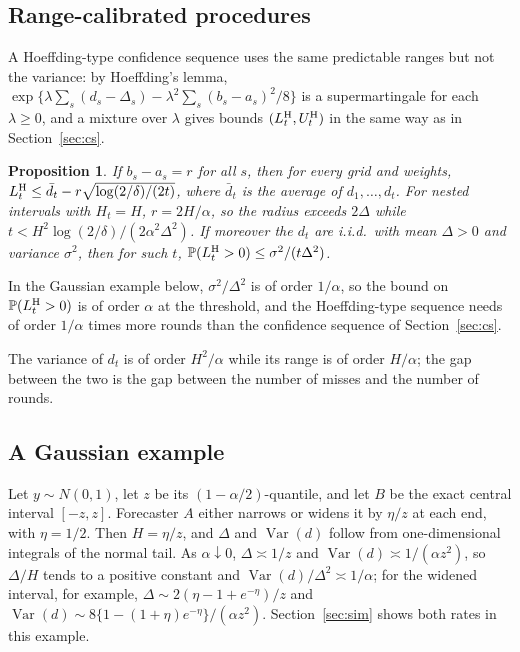 \documentclass[11pt]{article}
\newtheorem{proposition}{Proposition}
\theoremstyle{remark}
\theoremstyle{definition}
\renewcommand{\Pr}{\mathbb{P}}
\DeclareMathOperator{\Var}{Var}
\begin{document}
\subsection{Range-calibrated procedures}

A Hoeffding-type confidence sequence uses the same predictable ranges but
not the variance: by Hoeffding's lemma,
$\exp\{\lambda\sum_s(d_s-\Delta_s)-\lambda^2\sum_s(b_s-a_s)^2/8\}$ is a
supermartingale for each $\lambda\ge0$, and a mixture over $\lambda$ gives
bounds $(L^{\rm H}_t,U^{\rm H}_t)$ in the same way as in
Section~\ref{sec:cs}.

\begin{proposition}
\label{prop:hoeffding}
If $b_s-a_s=r$ for all $s$, then for every grid and weights,
$L^{\rm H}_t\le\bar d_t-r\sqrt{\log(2/\delta)/(2t)}$, where $\bar d_t$ is
the average of $d_1,\ldots,d_t$. For nested intervals with
$H_t=H$, $r=2H/\alpha$, so the radius exceeds $2\Delta$ while
$t<H^2\log(2/\delta)/(2\alpha^2\Delta^2)$. If moreover the $d_t$ are
i.i.d.\ with mean $\Delta>0$ and variance $\sigma^2$, then for such $t$,
$\Pr(L^{\rm H}_t>0)\le\sigma^2/(t\Delta^2)$.
\end{proposition}

In the Gaussian example below, $\sigma^2/\Delta^2$ is of order $1/\alpha$,
so the bound on $\Pr(L^{\rm H}_t>0)$ is of order $\alpha$ at the
threshold, and the Hoeffding-type sequence needs of order
$1/\alpha$ times more rounds than the confidence sequence of
Section~\ref{sec:cs}.

The variance of $d_t$ is of
order $H^2/\alpha$ while its range is of order $H/\alpha$; the gap between
the two is the gap between the number of misses and the number of rounds.

\subsection{A Gaussian example}
\label{sec:gauss}

Let $y\sim N(0,1)$, let $z$ be its $(1-\alpha/2)$-quantile, and let $B$ be the exact
central interval $[-z,z]$. Forecaster $A$ either narrows or widens it by
$\eta/z$ at each end, with $\eta=1/2$. Then $H=\eta/z$, and
$\Delta$ and $\Var(d)$ follow from one-dimensional integrals of the normal
tail. As $\alpha\downarrow0$, $\Delta\asymp1/z$ and
$\Var(d)\asymp1/(\alpha z^2)$, so $\Delta/H$ tends to a positive constant
and $\Var(d)/\Delta^2\asymp1/\alpha$; for the widened interval, for
example, $\Delta\sim2(\eta-1+e^{-\eta})/z$ and
$\Var(d)\sim8\{1-(1+\eta)e^{-\eta}\}/(\alpha z^2)$. Section~\ref{sec:sim}
shows both rates in this example.
\end{document}
